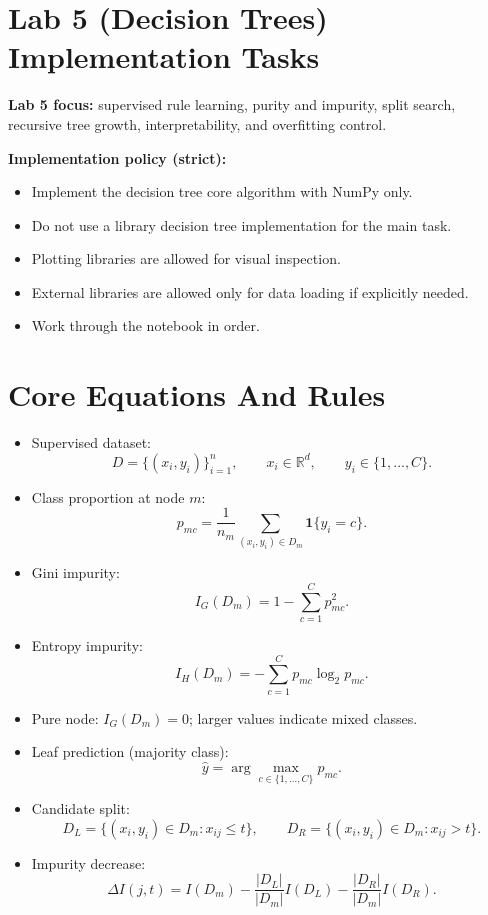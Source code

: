 \section*{Lab 5 (Decision Trees) Implementation Tasks}
\textbf{Lab 5 focus:} supervised rule learning, purity and impurity, split search, recursive tree growth, interpretability, and overfitting control.

\medskip
\textbf{Implementation policy (strict):}
\begin{itemize}
  \item Implement the decision tree core algorithm with NumPy only.
  \item Do not use a library decision tree implementation for the main task.
  \item Plotting libraries are allowed for visual inspection.
  \item External libraries are allowed only for data loading if explicitly needed.
  \item Work through the notebook in order.
\end{itemize}

\section*{Core Equations And Rules}
\begin{itemize}
  \item Supervised dataset:
  \[
    D=\{(x_i,y_i)\}_{i=1}^{n},
    \qquad
    x_i\in\mathbb{R}^d,
    \qquad
    y_i\in\{1,\dots,C\}.
  \]
  \item Class proportion at node $m$:
  \[
    p_{mc}
    =
    \frac{1}{n_m}
    \sum_{(x_i,y_i)\in D_m}\mathbf{1}\{y_i=c\}.
  \]
  \item Gini impurity:
  \[
    I_G(D_m)=1-\sum_{c=1}^{C}p_{mc}^{2}.
  \]
  \item Entropy impurity:
  \[
    I_H(D_m)=-\sum_{c=1}^{C}p_{mc}\log_2 p_{mc}.
  \]
  \item Pure node: $I_G(D_m)=0$; larger values indicate mixed classes.
  \item Leaf prediction (majority class):
  \[
    \hat{y}=\arg\max_{c\in\{1,\dots,C\}} p_{mc}.
  \]
  \item Candidate split:
  \[
    D_L=\{(x_i,y_i)\in D_m:x_{ij}\leq t\},
    \qquad
    D_R=\{(x_i,y_i)\in D_m:x_{ij}>t\}.
  \]
  \item Impurity decrease:
  \[
    \Delta I(j,t)
    =
    I(D_m)
    -
    \frac{|D_L|}{|D_m|}I(D_L)
    -
    \frac{|D_R|}{|D_m|}I(D_R).
  \]
\end{itemize}


